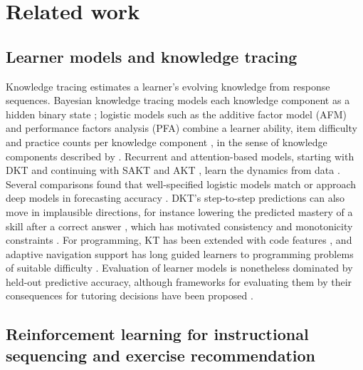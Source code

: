 \section{Related work}\label{sec:related}

\subsection{Learner models and knowledge tracing}

Knowledge tracing estimates a learner's evolving knowledge from response sequences. Bayesian knowledge tracing models each knowledge component as a hidden binary state \citep{corbett1994bkt}; logistic models such as the additive factor model (AFM) and performance factors analysis (PFA) combine a learner ability, item difficulty and practice counts per knowledge component \citep{cen2006lfa,pavlik2009pfa,pelanek2017learner}, in the sense of knowledge components described by \citet{koedinger2012kli}. Recurrent and attention-based models, starting with DKT \citep{piech2015dkt} and continuing with SAKT and AKT \citep{pandey2019sakt,ghosh2020akt}, learn the dynamics from data \citep[see][for a survey]{abdelrahman2023survey}. Several comparisons found that well-specified logistic models match or approach deep models in forecasting accuracy \citep{khajah2016deep,wilson2016basics,gervet2020deep}. DKT's step-to-step predictions can also move in implausible directions, for instance lowering the predicted mastery of a skill after a correct answer \citep{yeung2018dktplus}, which has motivated consistency and monotonicity constraints \citep{zhang2023cmkt}. For programming, KT has been extended with code features \citep{shi2022codedkt}, and adaptive navigation support has long guided learners to programming problems of suitable difficulty \citep{hsiao2010guiding,brusilovsky2007user}. Evaluation of learner models is nonetheless dominated by held-out predictive accuracy, although frameworks for evaluating them by their consequences for tutoring decisions have been proposed \citep{gonzalezbrenes2015leopard,huang2015multifaceted}.

\subsection{Reinforcement learning for instructional sequencing and exercise recommendation}

